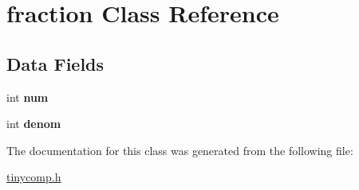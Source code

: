 \hypertarget{classfraction}{}\section{fraction Class Reference}
\label{classfraction}
\subsection*{Data Fields}
\begin{DoxyCompactItemize}
\item 
int {\bfseries num}\hypertarget{classfraction_a7700ec3a4dbbd05ba26e243fe5583a85}{}\label{classfraction_a7700ec3a4dbbd05ba26e243fe5583a85}

\item 
int {\bfseries denom}\hypertarget{classfraction_ae34d45953c8a4d73737d223de22e18c3}{}\label{classfraction_ae34d45953c8a4d73737d223de22e18c3}

\end{DoxyCompactItemize}


The documentation for this class was generated from the following file\+:\begin{DoxyCompactItemize}
\item 
\hyperlink{tinycomp_8h}{tinycomp.\+h}\end{DoxyCompactItemize}

